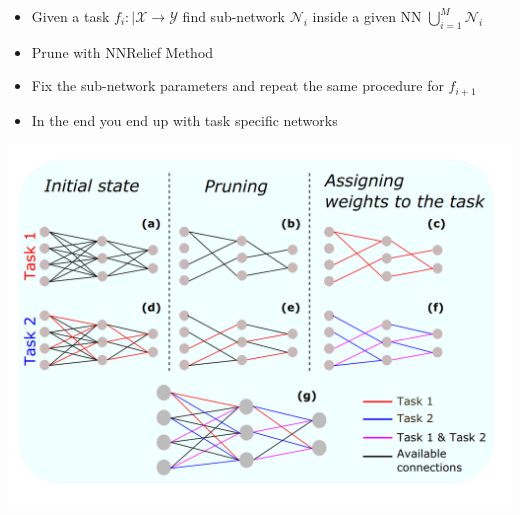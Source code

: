 \documentclass[a0paper,portrait]{baposter}
\begin{document}
\begin{poster}
{
  \begin{minipage}{0.5\textwidth}
  \begin{itemize}
    \item Given a task $f_i:|\mathcal{X}\to\mathcal{Y}$ find sub-network $\mathcal{N}_i$ inside a given NN $\bigcup_{i=1}^M \mathcal{N}_i $
    \item Prune with NNRelief Method
    \item Fix the sub-network parameters and repeat the same procedure for $f_{i+1}$
    \item In the end you end up with task specific networks 
  \end{itemize}
  \end{minipage}%
  \begin{minipage}{0.5\textwidth}
    \centering
    \includegraphics[width=\textwidth]{figures/pands.png}
  \end{minipage}
}



\end{poster}
\end{document}
